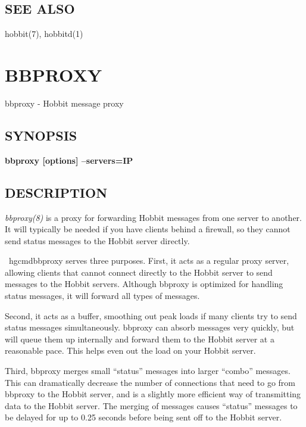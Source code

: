 \subsection{SEE ALSO}
hobbit(7), hobbitd(1) 

%
%

\newpage
\section{BBPROXY}

 bbproxy - Hobbit message proxy 
\subsection{SYNOPSIS}
\textbf{bbproxy [options] --servers=IP}

 
\subsection{DESCRIPTION}
\emph{bbproxy(8)}
 is a proxy for forwarding Hobbit messages from one server to another. It will typically be needed if you have clients behind a firewall, so they cannot send status messages to the Hobbit server directly. 

 ~\cite{web:patchutils}hgcmd{bbproxy} serves three purposes. First, it acts as a regular proxy server, allowing clients that cannot connect directly to the Hobbit server to send messages to the Hobbit servers. Although bbproxy is optimized for handling status messages, it will forward all types of messages.  



  Second, it acts as a buffer, smoothing out peak loads if many clients try to send status messages simultaneously. bbproxy can absorb messages very quickly, but will queue them up internally and forward them to the Hobbit server at a reasonable pace. This helps even out the load on your Hobbit server.  



  Third, bbproxy merges small ``status'' messages into larger ``combo'' messages. This can dramatically decrease the number of connections that need to go from bbproxy to the Hobbit server, and is a slightly more efficient way of transmitting data to the Hobbit server. The merging of messages causes ``status'' messages to be delayed for up to 0.25 seconds before being sent off to the Hobbit server. 



